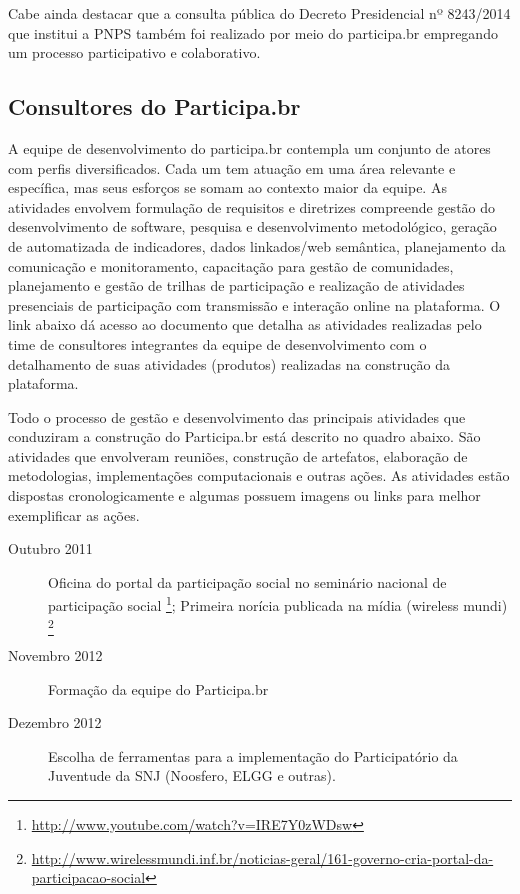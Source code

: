 \documentclass{article}
\begin{document}
Cabe ainda destacar que a consulta pública do Decreto Presidencial nº 8243/2014
que institui a PNPS também foi realizado por meio do participa.br empregando um
processo participativo e colaborativo.

\subsection{Consultores do Participa.br}

A equipe de desenvolvimento do participa.br contempla um conjunto de atores com
perfis diversificados. Cada um tem atuação em uma área relevante e específica,
mas seus esforços se somam ao contexto maior da equipe. As atividades envolvem
formulação de requisitos e diretrizes compreende gestão do desenvolvimento de
software, pesquisa e desenvolvimento metodológico, geração de automatizada de
indicadores, dados linkados/web semântica, planejamento da comunicação e
monitoramento, capacitação para gestão de comunidades, planejamento e gestão de
trilhas de participação e realização de atividades presenciais de participação
com transmissão e interação online na plataforma. O link abaixo dá acesso ao
documento que detalha as atividades realizadas pelo time de consultores
integrantes da equipe de desenvolvimento  com o detalhamento de suas atividades
(produtos) realizadas na construção da plataforma.


Todo o processo de gestão e desenvolvimento das principais atividades que
conduziram a construção do Participa.br está descrito no quadro abaixo. São
atividades que envolveram reuniões, construção de artefatos, elaboração de
metodologias, implementações computacionais e outras ações. As atividades estão
dispostas cronologicamente e algumas possuem imagens ou links para melhor
exemplificar as ações.

\begin{description}

  \item [Outubro 2011] Oficina do portal da participação social no seminário
  nacional de participação social \footnote{\url{http://www.youtube.com/watch?v=IRE7Y0zWDsw}};
  Primeira norícia publicada na mídia (wireless mundi)
  \footnote{\url{http://www.wirelessmundi.inf.br/noticias-geral/161-governo-cria-portal-da-participacao-social}}

  \item [Novembro 2012]
  Formação da equipe do Participa.br

  \item [Dezembro 2012]
  Escolha de ferramentas para a implementação do Participatório da Juventude da
  SNJ (Noosfero, ELGG e outras).

\end{description}
\end{document}
